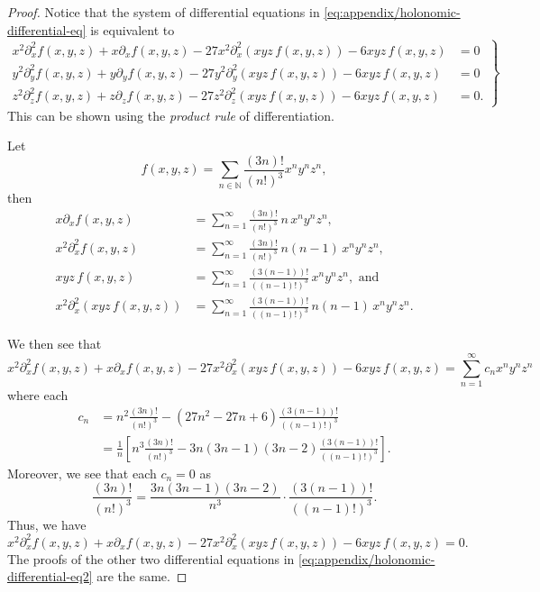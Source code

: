 \begin{proof}
	Notice that the system of differential equations in \eqref{eq:appendix/holonomic-differential-eq} is equivalent to
	\begin{equation}\label{eq:appendix/holonomic-differential-eq2}
	\left.
	\begin{aligned}
		x^2 \partial_x^2 f(x,y,z)
		+ x \partial_x f(x,y,z)
		-27 x^2 \partial_x^2 (x y z \, f(x,y,z))
		- 6 x y z \, f(x,y,z)
		&= 0
		\\
		y^2 \partial_y^2 f(x,y,z)
		+ y \partial_y f(x,y,z)
		-27 y^2 \partial_y^2 (x y z \, f(x,y,z))
		- 6 x y z \, f(x,y,z)
		&= 0
		\\
		z^2 \partial_z^2 f(x,y,z)
		+ z \partial_z f(x,y,z)
		-27 z^2 \partial_z^2 (x y z \, f(x,y,z))
		- 6 x y z \, f(x,y,z)
		&= 0.
	\end{aligned}
	\right\}
	\end{equation}
	This can be shown using the \emph{product rule} of differentiation.
	
	Let
	\[
		f(x,y,z) =
		\sum_{n \in \mathbb{N}}
		\frac{(3n)!}{(n!)^3}
		x^n y^n z^n,
	\]
	then
	\begin{align*}
			x \partial_x f(x,y,z)
			&=
			\sum_{n=1}^\infty
			\frac{(3n)!}{(n!)^3}
			\,n\,
			x^n y^n z^n,
		\\
			x^2 \partial_x^2 f(x,y,z)
			&=
			\sum_{n=1}^\infty
			\frac{(3n)!}{(n!)^3}
			\,n(n-1)\,
			x^n y^n z^n,
		\\
			xyz \, f(x,y,z)
			&=
			\sum_{n=1}^\infty
			\frac{(3(n-1))!}{((n-1)!)^3}
			\,
			x^n y^n z^n,\text{ and}
		\\
			x^2 \partial_x^2 (xyz \, f(x,y,z))
			&=
			\sum_{n=1}^\infty
			\frac{(3(n-1))!}{((n-1)!)^3}
			\,n(n-1)\,
			x^n y^n z^n.
	\end{align*}
	
	We then see that
	\[
		x^2 \partial_x^2 f(x,y,z)
		+ x \partial_x f(x,y,z)
		-27 x^2 \partial_x^2 (x y z \, f(x,y,z))
		- 6 x y z \, f(x,y,z)
		=
		\sum_{n=1}^\infty c_n x^n y^n z^n
	\]
	where each
	\begin{align*}
		c_n
		&=
		n^2
		\frac{(3n)!}{(n!)^3}
		-
		(27n^2 - 27n + 6)
		\frac{(3(n-1))!}{((n-1)!)^3}
		\\
		&=
		\frac{1}{n}
		\left[
			n^3
			\frac{(3n)!}{(n!)^3}
			-
			3n(3n-1)(3n-2)
			\frac{(3(n-1))!}{((n-1)!)^3}
		\right].
	\end{align*}
	Moreover, we see that each $c_n = 0$ as
	\[
		\frac{(3n)!}{(n!)^3}
		=
		\frac{3n(3n-1)(3n-2)}{n^3}
		\cdot
		\frac{(3(n-1))!}{((n-1)!)^3}.
	\]
	Thus, we have
	\[
		x^2 \partial_x^2 f(x,y,z)
		+ x \partial_x f(x,y,z)
		-27 x^2 \partial_x^2 (x y z \, f(x,y,z))
		- 6 x y z \, f(x,y,z)
		=
		0.
	\]
	The proofs of the other two differential equations in \eqref{eq:appendix/holonomic-differential-eq2} are the same.
\end{proof}
